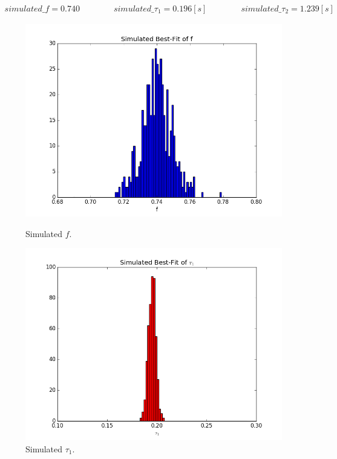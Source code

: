 \documentclass[a4paper,12pt]{article}
\begin{document}
\begin{align}
 simulated\_f = 0.740 \qquad \qquad simulated\_\tau_1 = 0.196 [s] \qquad \qquad simulated\_\tau_2 = 1.239 [s] \nonumber
\end{align}

\begin{figure}[h]
\centering
\begin{minipage}{.32\textwidth}
  \centering
  \includegraphics[width=1.05\linewidth]{img/simulated_f}
  \caption{Simulated $f$.}
  \label{fig.6}
\end{minipage}%
\begin{minipage}{.32\textwidth}
  \centering
  \includegraphics[width=1.05\linewidth]{img/simulated_tau1}
  \caption{Simulated $\tau_1$.}

\end{minipage}
\end{figure}
\end{document}

